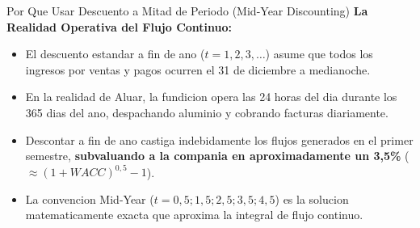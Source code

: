 \documentclass[10pt,a4paper]{article}
\theoremstyle{definition}
\begin{document}
\begin{conceptbox}{Por Que Usar Descuento a Mitad de Periodo (Mid-Year Discounting)}
\textbf{La Realidad Operativa del Flujo Continuo:}
\begin{itemize}
    \item El descuento estandar a fin de ano ($t = 1, 2, 3, \dots$) asume que todos los ingresos por ventas y pagos ocurren el 31 de diciembre a medianoche.
    \item En la realidad de Aluar, la fundicion opera las 24 horas del dia durante los 365 dias del ano, despachando aluminio y cobrando facturas diariamente.
    \item Descontar a fin de ano castiga indebidamente los flujos generados en el primer semestre, \textbf{subvaluando a la compania en aproximadamente un 3,5\%} ($\approx (1+WACC)^{0,5} - 1$).
    \item La convencion Mid-Year ($t = 0,5; 1,5; 2,5; 3,5; 4,5$) es la solucion matematicamente exacta que aproxima la integral de flujo continuo.
\end{itemize}
\end{conceptbox}
\end{document}
